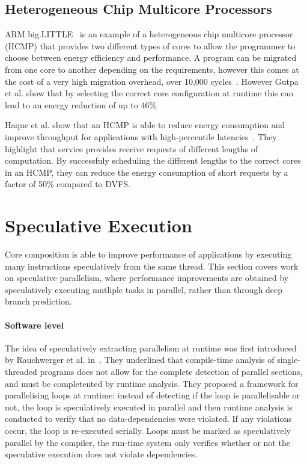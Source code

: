 \subsection{Heterogeneous Chip Multicore Processors}
ARM big.LITTLE~\cite{armbig} is an example of a heterogeneous chip multicore processor (HCMP) that provides two different types of cores to allow the programmer to choose between energy efficiency and performance.
A program can be migrated from one core to another depending on the requirements, however this comes at the cost of a very high migration overhead, over 10,000 cycles~\cite{armbig}.
However Gutpa et al. show that by selecting the correct core configuration at runtime this can lead to an energy reduction of up to 46\%

Haque et al. show that an HCMP is able to reduce energy consumption and improve throughput for applications with high-percentile latencies~\cite{tailAMP2017}.
They highlight that service provides receive requests of different lengths of computation.
By successfuly scheduling the different lengths to the correct cores in an HCMP, they can reduce the energy consumption of short requests by a factor of 50\% compared to DVFS.

\section{Speculative Execution}
Core composition is able to improve performance of applications by executing many instructions speculatively from the same thread.
This section covers work on speculative parallelism, where performance improvements are obtained by speculatively executing mutliple tasks in parallel, rather than through deep branch prediction.

\paragraph*{Software level}
The idea of speculatively extracting parallelism at runtime was first introduced by Rauchwerger et al. in~\cite{runtimeSpec}.
They underlined that compile-time analysis of single-threaded programs does not allow for the complete detection of parallel sections, and must be completented by runtime analysis.
They proposed a framework for parallelising loops at runtime: instead of detecting if the loop is parallelisable or not, the loop is speculatively executed in parallel and then runtime analysis is conducted to verify that no data-dependencies were violated.
If any violations occur, the loop is re-executed serially.
Loops must be marked as speculatively parallel by the compiler, the run-time system only verifies whether or not the speculative execution does not violate dependencies.


